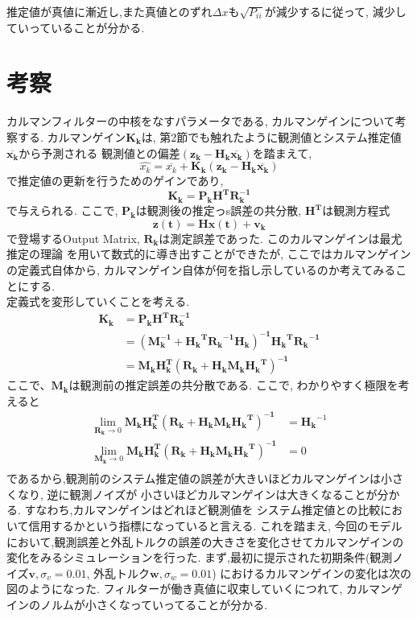 \documentclass[dvipdfmx, fleqn, uplatex, a4paper]{jsarticle}
\begin{document}
推定値が真値に漸近し,また真値とのずれ$\Delta x$も$\sqrt{P_{ii}}$が減少するに従って,
減少していっていることが分かる.

\section{考察}
カルマンフィルターの中核をなすパラメータである, カルマンゲインについて考察する.
カルマンゲイン$\bm{K_k}$は, 第2節でも触れたように観測値とシステム推定値$\bm{\overline{x_k}}$から予測される
観測値との偏差$\bm{(z_k- H_k\overline{x_k})}$を踏まえて,
\begin{equation}
  \hat{x_k} = \overline{x_k} +\bm{K_k(z_k- H_k\overline{x_k})}
\end{equation}
で推定値の更新を行うためのゲインであり,
\begin{equation}
  \bm{K_k} = \bm{P_k H^T R_k^{-1}}
\end{equation}
で与えられる. ここで, $\bm{P_k}$は観測後の推定っs誤差の共分散, $\bm{H^T}$は観測方程式
\begin{equation}
  \bm{z(t)} = \bm{Hx(t)} + \bm{v_k}
\end{equation}
で登場するOutput Matrix, $\bm{R_k}$は測定誤差であった. このカルマンゲインは最尤推定の理論
を用いて数式的に導き出すことができたが, ここではカルマンゲインの定義式自体から,
カルマンゲイン自体が何を指し示しているのか考えてみることにする. \\
定義式を変形していくことを考える.
\begin{align}
  \bm{K_k} &= \bm{P_k H^T R_k^{-1}} \nonumber \\
           &= \bm{{(M_k^{-1}+{H_k}^{T}{R_k}^{-1}H_k)}^{-1}{H_k}^T{R_k}^{-1}}\nonumber \\
           &= \bm{{M_kH_k^{T}}{(R_k + H_kM_k{H_k}^T)}^{-1}}
\end{align}
ここで、$\bm{M_k}$は観測前の推定誤差の共分散である. ここで, わかりやすく極限を考えると
\begin{align}
  \lim_{\bm{R_k} \to 0} \bm{{M_kH_k^{T}}{(R_k + H_kM_k{H_k}^T)}^{-1}} &= {\bm{H_k}}^{-1} \\
  \lim_{\bm{M_k} \to 0} \bm{{M_kH_k^{T}}{(R_k + H_kM_k{H_k}^T)}^{-1}} &= 0 \\
\end{align}
であるから,観測前のシステム推定値の誤差が大きいほどカルマンゲインは小さくなり, 逆に観測ノイズが
小さいほどカルマンゲインは大きくなることが分かる. すなわち,カルマンゲインはどれほど観測値を
システム推定値との比較において信用するかという指標になっていると言える. これを踏まえ, 今回のモデル
において,観測誤差と外乱トルクの誤差の大きさを変化させてカルマンゲインの変化をみるシミュレーションを行った.
まず,最初に提示された初期条件(観測ノイズ$\bm{v}, \sigma_v = 0.01$, 外乱トルク$\bm{w}, \sigma_w = 0.01$)
におけるカルマンゲインの変化は次の図のようになった. フィルターが働き真値に収束していくにつれて,
カルマンゲインのノルムが小さくなっていってることが分かる.
\end{document}
